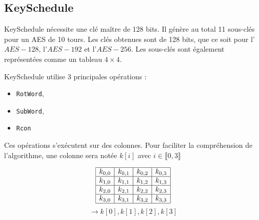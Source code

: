 
\subsection{KeySchedule}

\indent KeySchedule nécessite une clé maître de 128 bits. Il génère au total 11 sous-clés pour un AES de 10 tours. Les clés obtenues sont de 128 bits, que ce soit pour l'$AES-128$, l'$AES-192$ et l'$AES-256$. Les sous-clés sont également représentées comme un tableau $4 \times 4$.

KeySchedule utilise 3 principales opérations :
\begin{itemize}
\item \texttt{RotWord},
\item \texttt{SubWord},
\item \texttt{Rcon}
\end{itemize}
Ces opérations s'exécutent sur des colonnes. Pour faciliter la compréhension de l'algorithme, une colonne sera notée $k[i]$ avec $i \in \llbracket 0,3 \rrbracket$

$$ \begin{array}{|c|c|c|c|} \hline k_{0,0} & k_{0,1} & k_{0,2} & k_{0,3} \\ \hline k_{1,0} & k_{1,1} & k_{1,2} & k_{1,3} \\ \hline k_{2,0} & k_{2,1} & k_{2,2} & k_{2,3} \\ \hline k_{3,0} & k_{3,1} & k_{3,2} & k_{3,3} \\ \hline \end{array} $$ 
$$\longrightarrow k[0], k[1], k[2], k[3] $$

